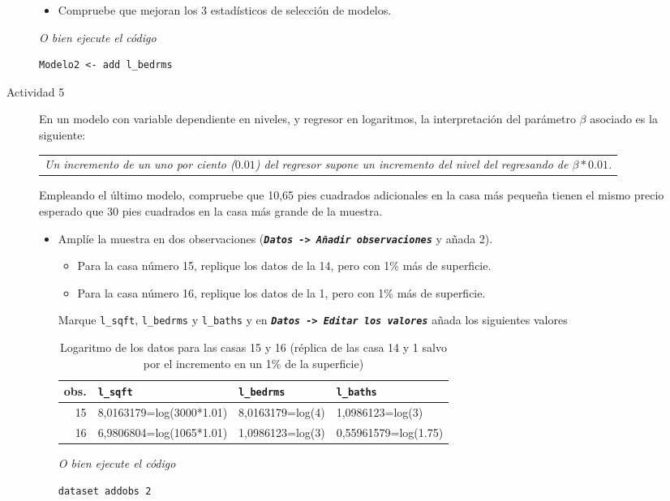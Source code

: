 \documentclass[11pt]{article}
\begin{document}
\begin{description}
\begin{itemize}
\item Compruebe que mejoran los 3 estadísticos de selección de
modelos.
\end{itemize}

\emph{O bien ejecute el código}
\begin{verbatim}
Modelo2 <- add l_bedrms
\end{verbatim}

\item[{Actividad 5}] En un modelo con variable dependiente en niveles, y
regresor en logaritmos, la interpretación del parámetro \(\beta\)
asociado es la siguiente:
\begin{center}
\begin{tabular}{l}
\emph{Un incremento de un uno por ciento (\(0.01\)) del regresor supone un incremento del nivel del regresando de \(\beta*0.01\).}\\
\end{tabular}
\end{center}
 Empleando el último modelo, compruebe que 10,65 pies cuadrados
adicionales en la casa más pequeña tienen el mismo precio esperado
que 30 pies cuadrados en la casa más grande de la muestra.

\begin{itemize}
\item Amplíe la muestra en dos observaciones (\textbf{\emph{\texttt{Datos -> Añadir
    observaciones}}} y añada 2).

\begin{itemize}
\item Para la casa número 15, replique los datos de la 14, pero con 1\% más de superficie.
\item Para la casa número 16, replique los datos de la 1, pero  con 1\% más de superficie.
\end{itemize}

Marque \texttt{l\_sqft}, \texttt{l\_bedrms} y \texttt{l\_baths} y en \textbf{\emph{\texttt{Datos -> Editar
    los valores}}} añada los siguientes valores

\begin{table}[htbp]
\caption{Logaritmo de los datos para las casas 15 y 16 (réplica de las casa 14 y 1 salvo por el incremento en un 1\% de la superficie)}
\centering
\begin{tabular}{rlll}
obs. & \texttt{l\_sqft} & \texttt{l\_bedrms} & \texttt{l\_baths}\\
\hline
15 & 8,0163179=log(3000*1.01) & 8,0163179=log(4) & 1,0986123=log(3)\\
16 & 6,9806804=log(1065*1.01) & 1,0986123=log(3) & 0,55961579=log(1.75)\\
\end{tabular}
\end{table}
\emph{O bien ejecute el código}
\begin{verbatim}
dataset addobs 2


\end{verbatim}
\end{itemize}
\end{description}
\end{document}
